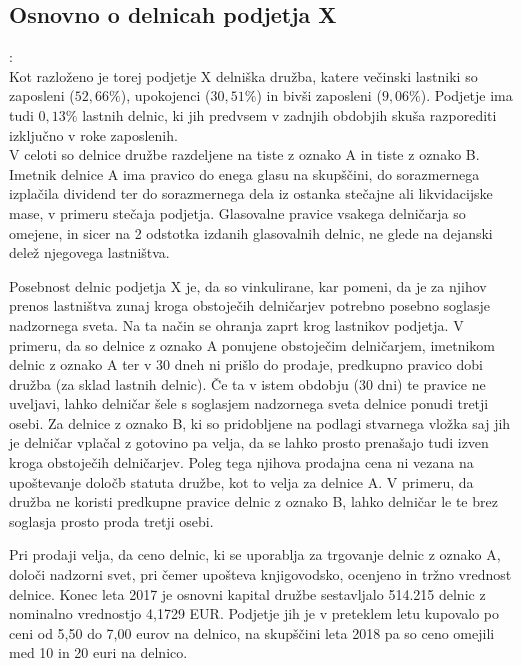 \documentclass[12pt,a4paper]{amsart}
\theoremstyle{definition} %
\theoremstyle{plain} %
\begin{document}
\subsection{Osnovno o delnicah podjetja X}:\\

Kot razloženo je torej podjetje X delniška družba, katere večinski lastniki so zaposleni ($52,66\%$), upokojenci ($30,51\%$) in bivši zaposleni ($9,06\%$). Podjetje ima tudi $0,13\%$ lastnih delnic, ki jih predvsem v zadnjih obdobjih skuša razporediti izključno v roke zaposlenih.\\
V celoti so delnice družbe razdeljene na tiste z oznako A in tiste z oznako B. Imetnik delnice A ima pravico do enega glasu na skupščini, do sorazmernega izplačila dividend ter do sorazmernega dela iz ostanka stečajne ali likvidacijske mase, v primeru stečaja podjetja. Glasovalne pravice vsakega delničarja so omejene, in sicer na 2 odstotka izdanih glasovalnih delnic, ne glede na dejanski delež njegovega lastništva.\par
Posebnost delnic podjetja X je, da so vinkulirane, kar pomeni, da je za njihov prenos lastništva zunaj kroga obstoječih delničarjev potrebno posebno soglasje nadzornega sveta. Na ta način se ohranja zaprt krog lastnikov podjetja. V primeru, da so delnice z oznako A ponujene obstoječim delničarjem, imetnikom delnic z oznako A ter v 30 dneh ni prišlo do prodaje, predkupno pravico dobi družba (za sklad lastnih delnic). Če ta v istem obdobju (30 dni) te pravice ne uveljavi, lahko delničar šele s soglasjem nadzornega sveta delnice ponudi tretji osebi.
Za delnice z oznako B, ki so pridobljene na podlagi stvarnega vložka saj jih je delničar vplačal z gotovino pa velja, da se lahko prosto prenašajo tudi izven kroga obstoječih delničarjev. Poleg tega njihova prodajna cena ni vezana na upoštevanje določb statuta družbe, kot to velja za delnice A. V primeru, da družba ne koristi predkupne pravice delnic z oznako B, lahko delničar le te brez soglasja prosto proda tretji osebi.\par
Pri prodaji velja, da ceno delnic, ki se uporablja za trgovanje delnic z oznako A, določi nadzorni svet, pri čemer upošteva knjigovodsko, ocenjeno in tržno vrednost delnice. Konec leta 2017 je osnovni kapital družbe sestavljalo 514.215 delnic z nominalno vrednostjo 4,1729 EUR. Podjetje jih je v preteklem letu kupovalo po ceni od 5,50 do 7,00 eurov na delnico, na skupščini leta 2018 pa so ceno omejili med 10 in 20 euri na delnico.
\end{document}
